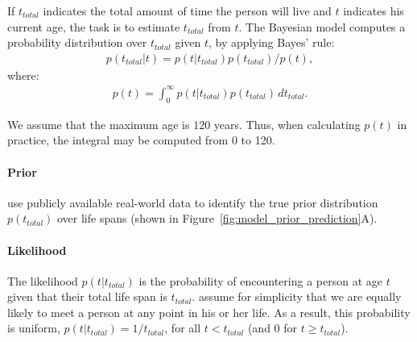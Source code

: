 \documentclass[10pt,letterpaper]{article}
\begin{document}
If $t_{total}$ indicates the total amount of time the person will live and $t$ indicates his current age, the task is to estimate $t_{total}$ from $t$. The Bayesian model computes a probability distribution over $t_{total}$ given $t$, by applying Bayes' rule:
\begin{equation}
\label{eqn:bayes_rule}
\begin{aligned}
p(t_{total} | t) = p(t | t_{total})p(t_{total}) / p(t) ,
\end{aligned}
\end{equation}
where:
\begin{equation}
\label{eqn:p_t}
\begin{aligned}
p(t) = \int_{0}^\infty p(t | t_{total})p(t_{total}) \, dt_{total} .
\end{aligned}
\end{equation}

We assume that the maximum age is $120$ years. %
Thus, when calculating $p(t)$ in practice, the integral may be computed from 0 to 120.

\paragraph{Prior}

 use publicly available real-world data to identify the true prior distribution $p(t_{total})$ over life spans (shown in Figure~\ref{fig:model_prior_prediction}A).

\paragraph{Likelihood}

The likelihood $p(t | t_{total})$ is the probability of encountering a person at age $t$ given that their total life span is $t_{total}$.  assume for simplicity that we are equally likely to meet a person at any point in his or her life. As a result, this probability is uniform, $p(t | t_{total}) = 1/t_{total}$, for all $t < t_{total}$ (and 0 for $t \ge t_{total}$).
\end{document}
